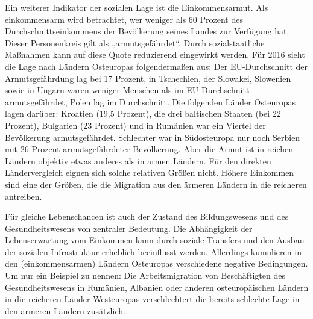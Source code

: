 \begin{multicols*}{2}
Ein weiterer Indikator der sozialen Lage ist die Einkommensarmut. Als einkommensarm wird betrachtet, wer weniger als 60 Prozent des Durchschnittseinkommens der Bevölkerung seines Landes zur Verfügung hat.  Dieser Personenkreis gilt als „armutsgefährdet“. Durch sozialstaatliche Maßnahmen kann auf diese Quote reduzierend eingewirkt werden. Für 2016 sieht die Lage nach Ländern Osteuropas folgendermaßen aus: Der EU-Durchschnitt der Armutsgefährdung lag bei 17 Prozent, in Tschechien, der Slowakei, Slowenien sowie in Ungarn waren weniger Menschen als im EU-Durchschnitt armutsgefährdet, Polen lag im Durchschnitt. Die folgenden Länder Osteuropas lagen darüber: Kroatien (19,5 Prozent), die drei baltischen Staaten (bei 22 Prozent), Bulgarien (23 Prozent) und in Rumänien war ein Viertel der Bevölkerung armutsgefährdet. Schlechter war in Südosteuropa nur noch Serbien mit 26 Prozent armutsgefährdeter Bevölkerung.  Aber die Armut ist in reichen Ländern objektiv etwas anderes als in armen Ländern. Für den direkten Ländervergleich eignen sich solche relativen Größen nicht. Höhere Einkommen sind eine der Größen, die die Migration aus den ärmeren Ländern in die reicheren antreiben. 

Für gleiche Lebenschancen ist auch der Zustand des Bildungswesens und des Gesundheitswesens von zentraler Bedeutung. Die Abhängigkeit der Lebenserwartung vom Einkommen kann durch soziale Transfers und den Ausbau der sozialen Infrastruktur erheblich beeinflusst werden. Allerdings kumulieren in den (einkommensarmen) Ländern Osteuropas verschiedene negative Bedingungen. Um nur ein Beispiel zu nennen: Die Arbeitsmigration von Beschäftigten des Gesundheitswesens in Rumänien, Albanien oder anderen osteuropäischen Ländern in die reicheren Länder Westeuropas verschlechtert die bereits schlechte Lage in den ärmeren Ländern zusätzlich.


\end{multicols*}
